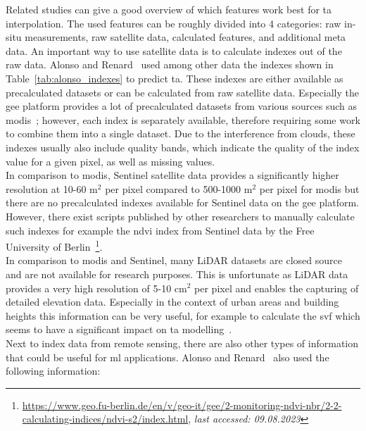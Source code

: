 Related studies can give a good overview of which features work best for \gls{ta} interpolation. The used features can be roughly divided into 4 categories: raw in-situ measurements, raw satellite data, calculated features, and additional meta data. An important way to use satellite data is to calculate indexes out of the raw data. Alonso and Renard~\cite{alonso2020new} used among other data the indexes shown in Table~\ref{tab:alonso_indexes} to predict \gls{ta}. These indexes are either available as precalculated datasets or can be calculated from raw satellite data. Especially the \gls{gee} platform provides a lot of precalculated datasets from various sources such as \gls{modis}~\cite{didan2021modis}; however, each index is separately available, therefore requiring some work to combine them into a single dataset. Due to the interference from clouds, these indexes usually also include quality bands, which indicate the quality of the index value for a given pixel, as well as missing values.\\
In comparison to \gls{modis}, Sentinel satellite data provides a significantly higher resolution at 10-60 m$^2$ per pixel compared to 500-1000 m$^2$ per pixel for \gls{modis} but there are no precalculated indexes available for Sentinel data on the \gls{gee} platform.\\
However, there exist scripts published by other researchers to manually calculate such indexes for example the \gls{ndvi} index from Sentinel data by the Free University of Berlin~\footnote{\url{https://www.geo.fu-berlin.de/en/v/geo-it/gee/2-monitoring-ndvi-nbr/2-2-calculating-indices/ndvi-s2/index.html}, \textit{last accessed: 09.08.2023}}.\\
In comparison to \gls{modis} and Sentinel, many LiDAR datasets are closed source and are not available for research purposes. This is unfortunate as LiDAR data provides a very high resolution of 5-10 cm$^2$ per pixel and enables the capturing of detailed elevation data. Especially in the context of urban areas and building heights this information can be very useful, for example to calculate the \gls{svf} which seems to have a significant impact on \gls{ta} modelling~\cite{dirksen2019sky}.\\
Next to index data from remote sensing, there are also other types of information that could be useful for \gls{ml} applications. Alonso and Renard~\cite{alonso2020new} also used the following information:

